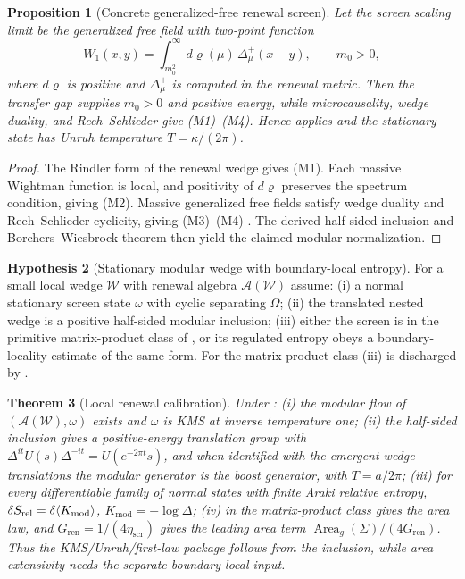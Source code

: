 \documentclass[11pt]{article}
\newtheorem{theorem}{Theorem}[section]
\newtheorem{proposition}[theorem]{Proposition}
\theoremstyle{definition}
\newtheorem{hypothesis}[theorem]{Hypothesis}
\theoremstyle{remark}
\newcommand{\A}{\mathcal A}
\newcommand{\Area}{\operatorname{Area}}
\newcommand{\etaScr}{\eta_{\mathrm{scr}}}
\newcommand{\mods}{\Delta}
\newcommand{\Kmod}{K_{\mathrm{mod}}}
\newcommand{\Gren}{G_{\mathrm{ren}}}
\begin{document}
\begin{proposition}[Concrete generalized-free renewal screen]
\label{prop:concrete-quasifree-screen}
Let the screen scaling limit be the generalized free field with two-point
function
\[
 W_1(x,y)=\int_{m_0^2}^{\infty}d\varrho(\mu)\,\Delta^+_\mu(x-y),
 \qquad m_0>0,
\]
where $d\varrho$ is positive and $\Delta^+_\mu$ is computed in the renewal
metric.  Then the transfer gap supplies $m_0>0$ and positive energy, while
microcausality, wedge duality, and Reeh--Schlieder give
\textup{(M1)--(M4)}.  Hence  applies and the
stationary state has Unruh temperature $T=\kappa/(2\pi)$.
\end{proposition}

\begin{proof}
The Rindler form of the renewal wedge gives \textup{(M1)}.  Each massive
Wightman function is local, and positivity of $d\varrho$ preserves the spectrum
condition, giving \textup{(M2)}.  Massive generalized free fields satisfy wedge
duality and Reeh--Schlieder cyclicity, giving \textup{(M3)--(M4)}
\cite{Araki,Driessler,ReehSchlieder}.  The derived half-sided inclusion and
Borchers--Wiesbrock theorem then yield the claimed modular normalization.
\end{proof}

\begin{hypothesis}[Stationary modular wedge with boundary-local entropy]
\label{hyp:stationary-primitive-wedge}
For a small local wedge $\mathcal W$ with renewal algebra $\A(\mathcal W)$ assume:
\textup{(i)} a normal stationary screen state $\omega$ with cyclic separating
$\Omega$; \textup{(ii)} the translated nested wedge is a positive half-sided
modular inclusion; \textup{(iii)} either the screen is in the primitive
matrix-product class of , or its regulated entropy
obeys a boundary-locality estimate of the same form.  For the matrix-product class
(iii) is discharged by .
\end{hypothesis}

\begin{theorem}[Local renewal calibration]
\label{thm:local-calibration}
Under : \textup{(i)} the modular flow of
$(\A(\mathcal W),\omega)$ exists and $\omega$ is KMS at inverse temperature one;
\textup{(ii)} the half-sided inclusion gives a positive-energy translation group
with $\mods^{it}U(s)\mods^{-it}=U(e^{-2\pi t}s)$, and when identified with the
emergent wedge translations the modular generator is the boost generator, with
$T=a/2\pi$; \textup{(iii)} for every differentiable family of normal states with
finite Araki relative entropy, $\delta S_{\rm rel}=\delta\langle\Kmod\rangle$,
$\Kmod=-\log\mods$; \textup{(iv)} in the matrix-product class
 gives the area law, and
$\Gren=1/(4\etaScr)$ gives the leading area term $\Area_g(\Sigma)/(4\Gren)$.  Thus
the KMS/Unruh/first-law package follows from the inclusion, while area extensivity
needs the separate boundary-local input.
\end{theorem}
\end{document}
